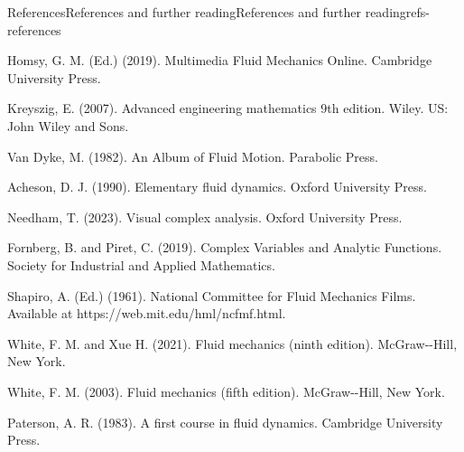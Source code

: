 \documentclass[oneside,10pt,]{book}
\newcommand{\xreffont}{\relax}
\numberwithin{equation}{section}
\providecommand\phantomsection{}
\begin{document}
%
\backmatter%
%
\clearpage\phantomsection%
%
%
{\xreffont\printindex}
%
%
%
\typeout{************************************************}
\typeout{************************************************}
%
\begin{references-chapter-numberless}{References}{References and further reading}{}{References and further reading}{}{}{refs-references}
\begin{referencelist}
\hypertarget{ref-homsy}{}Homsy, G. M. (Ed.) (2019). Multimedia Fluid Mechanics Online. Cambridge University Press.%

\hypertarget{ref-kreyszig}{}Kreyszig, E. (2007). Advanced engineering mathematics 9th edition. Wiley. US: John Wiley and Sons.%

\hypertarget{ref-album}{}Van Dyke, M. (1982). An Album of Fluid Motion. Parabolic Press.%

\hypertarget{ref-acheson}{}Acheson, D. J. (1990). Elementary fluid dynamics. Oxford University Press.%

\hypertarget{ref-needham}{}Needham, T. (2023). Visual complex analysis. Oxford University Press.%

\hypertarget{ref-fornberg}{}Fornberg, B. and Piret, C. (2019). Complex Variables and Analytic Functions. Society for Industrial and Applied Mathematics.%

\hypertarget{ref-ncfmf}{}Shapiro, A. (Ed.) (1961). National Committee for Fluid Mechanics Films. Available at https:\slash{}\slash{}web.mit.edu\slash{}hml\slash{}ncfmf.html.%

\hypertarget{ref-white-9}{}White, F. M. and Xue H. (2021). Fluid mechanics (ninth edition). McGraw-{}-{}Hill, New York.%

\hypertarget{ref-white-5}{}White, F. M. (2003). Fluid mechanics (fifth edition). McGraw-{}-{}Hill, New York.%

\hypertarget{ref-paterson}{}Paterson, A. R. (1983). A first course in fluid dynamics. Cambridge University Press.%

\end{referencelist}
\end{references-chapter-numberless}
\end{document}
